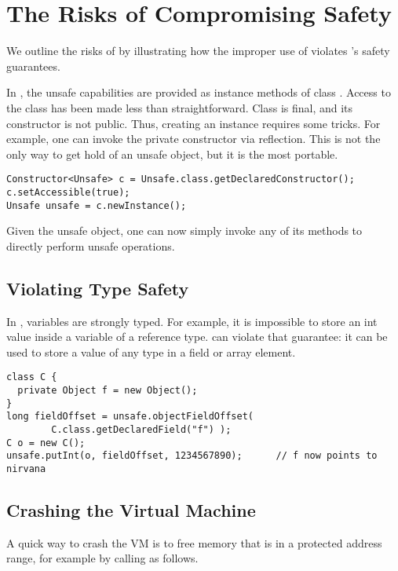 \section{The Risks of Compromising Safety}
\label{sec:unsafe:background}

We outline the risks of \unsafe{} by illustrating how the improper use of
\unsafe{} violates \java{}'s safety guarantees.

In \java{}, the unsafe capabilities are provided as instance methods of
class \smu{}.
Access to the class has been made less than straightforward.
Class \smu{} is final, and its constructor is not public.
Thus, creating an instance requires some tricks.
For example, one can invoke the private constructor via reflection.
This is not the only way to get hold of an unsafe object,
but it is the most portable.

\begin{lstlisting}[style=java,caption=Instantiating an Unsafe object]
Constructor<Unsafe> c = Unsafe.class.getDeclaredConstructor();
c.setAccessible(true);
Unsafe unsafe = c.newInstance();
\end{lstlisting}
 
Given the unsafe object, one can now simply invoke any of its methods to
directly perform unsafe operations.

\subsection*{Violating Type Safety}

In \java{}, variables are strongly typed.
For example, it is impossible to store an int value inside a variable of
a reference type.
\unsafe{} can violate that guarantee:
it can be used to store a value of any type in a field or array element.

\begin{lstlisting}[style=java,caption=\smu{} can violate type safety]
class C {
  private Object f = new Object();
}
long fieldOffset = unsafe.objectFieldOffset(
        C.class.getDeclaredField("f") );
C o = new C();
unsafe.putInt(o, fieldOffset, 1234567890);      // f now points to nirvana
\end{lstlisting}

\subsection*{Crashing the Virtual Machine}

A quick way to crash the VM is to free memory that is in a protected
address range, for example by calling  as follows.


